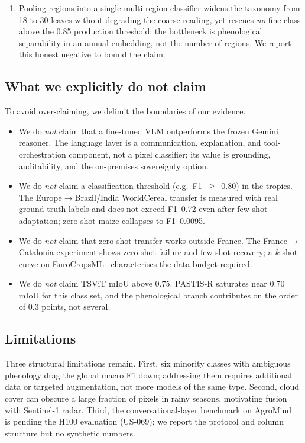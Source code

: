 \begin{enumerate}[leftmargin=*]
    reaches macro F1 0.266 on Lower Saxony (DE4), rescuing winter cereals
    --- and the foundation model pays down the few-shot label budget by
    roughly an order of magnitude (AlphaEarth beats raw Sentinel-2 by
    $+0.111$ F1 at $k{=}1$ on EuroCropsML LV$\rightarrow$EE).
    \item Pooling regions into a single multi-region classifier widens
    the taxonomy from 18 to 30 leaves without degrading the coarse
    reading, yet rescues \emph{no} fine class above the 0.85 production
    threshold: the bottleneck is phenological separability in an annual
    embedding, not the number of regions. We report this honest negative
    to bound the claim.
\end{enumerate}

\subsection{What we explicitly do not claim}
To avoid over-claiming, we delimit the boundaries of our evidence.
\begin{itemize}[leftmargin=*]
    \item We do \emph{not} claim that a fine-tuned VLM outperforms the
    frozen Gemini reasoner. The language layer is a communication,
    explanation, and tool-orchestration component, not a pixel
    classifier; its value is grounding, auditability, and the
    on-premises sovereignty option.
    \item We do \emph{not} claim a classification threshold
    (e.g.\ F1~$\geq$~0.80) in the tropics. The
    Europe$\rightarrow$Brazil/India WorldCereal transfer is measured
    with real ground-truth labels and does not exceed F1~0.72 even after
    few-shot adaptation; zero-shot maize collapses to F1~0.0095.
    \item We do \emph{not} claim that zero-shot transfer works outside
    France. The France$\rightarrow$Catalonia experiment shows zero-shot
    failure and few-shot recovery; a $k$-shot curve on
    EuroCropsML~\cite{reuss2025eurocropsml} characterises the data
    budget required.
    \item We do \emph{not} claim TSViT mIoU above 0.75. PASTIS-R
    saturates near 0.70 mIoU for this class set, and the phenological
    branch contributes on the order of $0.3$ points, not several.
\end{itemize}

\subsection{Limitations}
Three structural limitations remain. First, six minority classes with
ambiguous phenology drag the global macro F1 down; addressing them
requires additional data or targeted augmentation, not more models of
the same type. Second, cloud cover can obscure a large fraction of
pixels in rainy seasons, motivating fusion with Sentinel-1 radar.
Third, the conversational-layer benchmark on
AgroMind~\cite{ruan2025agromind} is pending the H100 evaluation
(US-069); we report the protocol and column structure but no
synthetic numbers.

